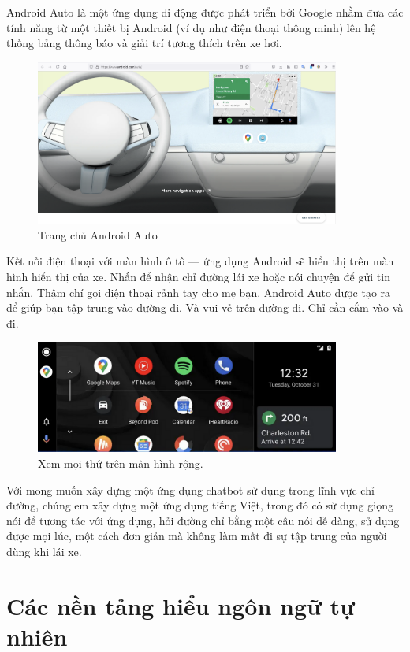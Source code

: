 Android Auto là một ứng dụng di động được phát triển bởi Google nhằm đưa các tính năng từ một thiết bị Android (ví dụ như điện thoại thông minh) lên hệ thống bảng thông báo và giải trí tương thích trên xe hơi.

\begin{figure}[H]
    \centering
    \includegraphics[width=10cm]{images/Android-Auto.png}
    \caption{Trang chủ Android Auto}
    \label{fig:homepage-android-auto}
\end{figure}

Kết nối điện thoại với màn hình ô tô — ứng dụng Android sẽ hiển thị trên màn hình hiển thị của xe. Nhấn để nhận chỉ đường lái xe hoặc nói chuyện để gửi tin nhắn. Thậm chí gọi điện thoại rảnh tay cho mẹ bạn. Android Auto được tạo ra để giúp bạn tập trung vào đường đi. Và vui vẻ trên đường đi. Chỉ cần cắm vào và đi.

\begin{figure}[H]
    \centering
    \includegraphics[width=10cm]{images/widescreen.png}
    \caption{Xem mọi thứ trên màn hình rộng.}
    \label{fig:homepage-widescreen-Android}
\end{figure}

Với mong muốn xây dựng một ứng dụng chatbot sử dụng trong lĩnh vực chỉ đường, chúng em xây dựng một ứng dụng tiếng Việt, trong đó có sử dụng giọng nói để tương tác với ứng dụng, hỏi đường chỉ bằng một câu nói dễ dàng, sử dụng được mọi lúc, một cách đơn giản mà không làm mất đi sự tập trung của người dùng khi lái xe.

\section{Các nền tảng hiểu ngôn ngữ tự nhiên}

